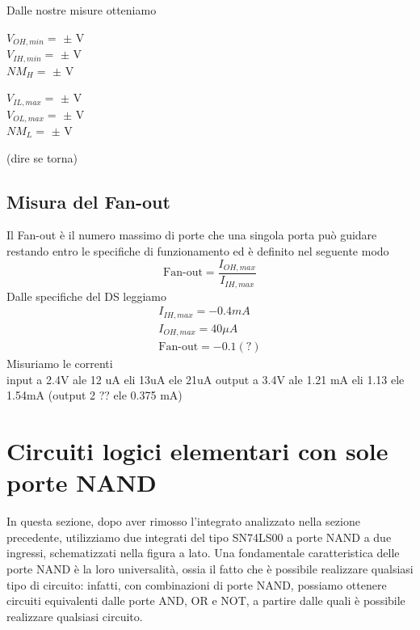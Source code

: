\documentclass[10pt, a4paper, italian]{article}
\begin{document}
Dalle nostre misure otteniamo %
\begin{multicols}{2}
    \centering
    $V_{OH,min}=$ $\pm$ V\\
    $V_{IH,min}=$ $\pm$ V\\
    $NM_H=$ $\pm$ V
    
    $V_{IL,max}=$ $\pm$ V\\
    $V_{OL,max}=$ $\pm$ V\\
    $NM_L=$ $\pm$ V
\end{multicols}
(dire se torna)

\subsection{Misura del Fan-out}
Il Fan-out è il numero massimo di porte che una singola porta può guidare restando entro le specifiche di funzionamento ed è definito nel seguente modo
\[
\mbox{Fan-out}=\frac{I_{OH,max}}{I_{IH,max}}
\]
Dalle specifiche del DS leggiamo
\begin{gather*}
    I_{IH,max}=-0.4 mA\\
    I_{OH,max}= 40 \mu A\\
    \mbox{Fan-out}=-0.1 (?) %
\end{gather*}
Misuriamo le correnti\\ %
input a 2.4V ale 12 uA eli  13uA ele 21uA
output a 3.4V ale 1.21 mA eli 1.13 ele 1.54mA
(output 2 ?? ele 0.375 mA)
\section{Circuiti logici elementari con sole porte NAND}
\begin{minipage}{0.65\textwidth}
    In questa sezione, dopo aver rimosso l'integrato analizzato nella sezione precedente, utilizziamo due integrati del tipo SN74LS00 a porte NAND a due ingressi, schematizzati nella figura a lato. Una fondamentale caratteristica delle porte NAND è la loro universalità, ossia il fatto che è possibile realizzare qualsiasi tipo di circuito: infatti, con combinazioni di porte NAND, possiamo ottenere circuiti equivalenti dalle porte AND, OR e NOT, a partire dalle quali è possibile realizzare qualsiasi circuito.
\end{minipage}
\begin{minipage}{0.35\textwidth}
    \label{NAND}
\end{minipage}
\end{document}
